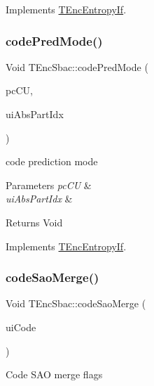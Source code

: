Implements \hyperlink{class_t_enc_entropy_if}{T\+Enc\+Entropy\+If}.

\mbox{\label{class_t_enc_sbac_a26ec0b34abb4bc05f6b784b6d8556fc4}} 
\subsubsection{\texorpdfstring{code\+Pred\+Mode()}{codePredMode()}}
{\footnotesize\ttfamily Void T\+Enc\+Sbac\+::code\+Pred\+Mode (\begin{DoxyParamCaption}\item[{\hyperlink{class_t_com_data_c_u}{T\+Com\+Data\+CU} $\ast$}]{pc\+CU,  }\item[{U\+Int}]{ui\+Abs\+Part\+Idx }\end{DoxyParamCaption})\hspace{0.3cm}{\ttfamily [virtual]}}

code prediction mode 
\begin{DoxyParams}{Parameters}
{\em pc\+CU} & \\
\hline
{\em ui\+Abs\+Part\+Idx} & \\
\hline
\end{DoxyParams}
\begin{DoxyReturn}{Returns}
Void 
\end{DoxyReturn}


Implements \hyperlink{class_t_enc_entropy_if}{T\+Enc\+Entropy\+If}.

\mbox{\label{class_t_enc_sbac_aa990cbcee1440bd3a04c6bdbf712dbb8}} 
\subsubsection{\texorpdfstring{code\+Sao\+Merge()}{codeSaoMerge()}}
{\footnotesize\ttfamily Void T\+Enc\+Sbac\+::code\+Sao\+Merge (\begin{DoxyParamCaption}\item[{U\+Int}]{ui\+Code }\end{DoxyParamCaption})}

Code S\+AO merge flags \mbox{\label{class_t_enc_sbac_ae2be9bb13b55341345f29e5837387409}} 

